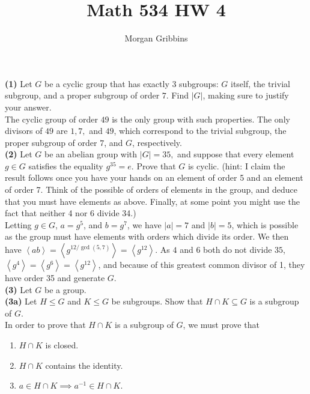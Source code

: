 \documentclass[12pt,letterpaper]{article}
\title{Math 534 HW 4}
\author{Morgan Gribbins}
\date{}
\begin{document}
	
\maketitle

\textbf{(1)} Let \(G\) be a cyclic group that has exactly 3 subgroups: \(G\) itself, the trivial subgroup, and a proper subgroup of order \(7\). Find \(|G|\), making sure to justify your answer. \\

The cyclic group of order \(49\) is the only group with such properties. The only divisors of \(49\) are \(1,7,\) and \(49\), which correspond to the trivial subgroup, the proper subgroup of order \(7\), and \(G\), respectively. \\

\textbf{(2)} Let \(G\) be an abelian group with \(|G|= 35,\) and suppose that every element \(g \in G \) satisfies the equality \(g^{35}=e\).  Prove that \(G\) is cyclic.  (hint: I claim the result follows once you have your hands on an element of order 5 and an element of order 7.  Think of the possible of orders of elements in the group, and deduce that you must have elements as above.  Finally, at some point you might use the fact that neither 4 nor 6 divide 34.) \\

Letting \(g \in G\), \(a = g^{5}\), and \(b = g^{7}\), we have \(|a| = 7\) and \(|b| = 5\), which is possible as the group must have elements with orders which divide its order. We then have \(\left<ab\right> = \left<g^{12/\gcd(5,7)}\right> = \left<g^{12}\right>\). As \(4\) and \(6\) both do not divide \(35\), \(\left<g^{4}\right> = \left<g^{6}\right> = \left<g^{12}\right>\), and because of this greatest common divisor of 1, they have order 35 and generate \(G\). \\

\textbf{(3)} Let \(G\) be a group.\\

\textbf{(3a)} Let \(H \leq G\) and \(K \leq G\) be subgroups. Show that \(H \cap K \subseteq G\) is a subgroup of \(G\). \\

In order to prove that \(H \cap K\) is a subgroup of \(G\), we must prove that 

\begin{enumerate}
	\item \(H \cap K\) is closed.
	\item \(H \cap K\) contains the identity.
	\item \(a \in H \cap K \implies a^{-1} \in H \cap K\). 
\end{enumerate}
\end{document}
